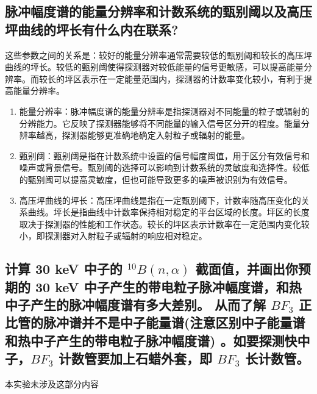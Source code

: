 \documentclass[a4paper,UTF8]{ctexart}
\begin{document}
\subsection{脉冲幅度谱的能量分辨率和计数系统的甄别阈以及高压坪曲线的坪长有什么内在联系?}

这些参数之间的关系是：较好的能量分辨率通常需要较低的甄别阈和较长的高压坪曲线的坪长。较低的甄别阈使得探测器对较低能量的信号更敏感，可以提高能量分辨率。而较长的坪区表示在一定能量范围内，探测器的计数率变化较小，有利于提高能量分辨率。

\begin{enumerate}
    \item 能量分辨率：脉冲幅度谱的能量分辨率是指探测器对不同能量的粒子或辐射的分辨能力。它反映了探测器能够将不同能量的输入信号区分开的程度。能量分辨率越高，探测器能够更准确地确定入射粒子或辐射的能量。
    \item 甄别阈：甄别阈是指在计数系统中设置的信号幅度阈值，用于区分有效信号和噪声或背景信号。甄别阈的选择可以影响到计数系统的灵敏度和选择性。较低的甄别阈可以提高灵敏度，但也可能导致更多的噪声被识别为有效信号。
    \item 高压坪曲线的坪长：高压坪曲线是指在一定甄别阈下，计数率随高压变化的关系曲线。坪长是指曲线中计数率保持相对稳定的平台区域的长度。坪区的长度取决于探测器的性能和工作状态。较长的坪区表示计数率在一定范围内变化较小，即探测器对入射粒子或辐射的响应相对稳定。
\end{enumerate}

\subsection{计算 30 keV 中子的 $^{10}B (n, \alpha)$ 截面值，并画出你预期的 30 keV 
中子产生的带电粒子脉冲幅度谱，和热中子产生的脉冲幅度谱有多大差别。
从而了解 $BF_3$ 正比管的脉冲谱并不是中子能量谱(注意区别中子能量谱和热中子产生的带电粒子脉冲幅度谱)
。如要探测快中子，$BF_3$ 计数管要加上石蜡外套，即 $BF_3$ 长计数管。}

本实验未涉及这部分内容
\end{document}
